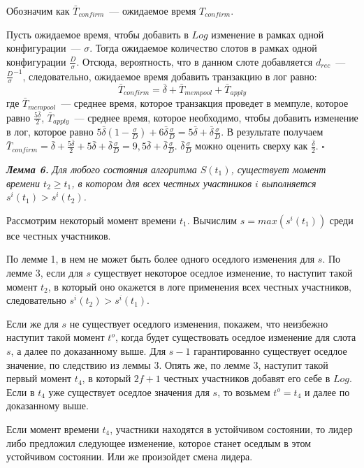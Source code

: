 Обозначим как $\bar{T}_{confirm}$~--- ожидаемое время  $T_{confirm}$.

Пусть ожидаемое время, чтобы добавить в $Log$ изменение в рамках одной конфигурации~--- $\sigma$.
Тогда ожидаемое количество слотов в рамках одной конфигурации $\frac{D}{\sigma}$. Отсюда, вероятность, что в данном слоте добавляется $d_{rec}$~--- $\frac{D}{\sigma}^{-1}$, следовательно, ожидаемое время добавить транзакцию в лог равно: 
$$\bar{T}_{confirm}=\bar{\delta}+\bar{T}_{mempool}+\bar{T}_{apply}$$
где $\bar{T}_{mempool}$~--- среднее время, которое транзакция проведет в мемпуле, которое равно $\frac{5\bar{\delta}}{2}$, $\bar{T}_{apply}$~--- среднее время, которое необходимо, чтобы добавить изменение в лог, которое равно $5\bar{\delta}(1-\frac{\sigma}{D})+6\bar{\delta}\frac{\sigma}{D}=5\bar{\delta}+\bar{\delta}\frac{\sigma}{D}$.
В результате получаем $\bar{T}_{confirm}=\bar{\delta}+\frac{5\bar{\delta}}{2}+5\bar{\delta}+\bar{\delta}\frac{\sigma}{D}=9,5\bar{\delta}+\bar{\delta}\frac{\sigma}{D}$. $\bar{\delta}\frac{\sigma}{D}$ можно оценить сверху как $\frac{\bar{\delta}}{2}$. $\square$
\vspace{10pt}

\textbf{\textit{Лемма 6.}}  \textit{Для любого состояния алгоритма $S(t_1)$, существует момент времени $t_2 \ge t_1$, в котором для всех честных участников $i$ выполняется $s^i(t_1)> s^i(t_2)$.}

Рассмотрим некоторый момент времени $t_1$. Вычислим $s=max(s^i(t_1))$ среди все честных участников. 

По лемме 1, в нем не может быть более одного оседлого изменения для $s$. По лемме 3, если для $s$ существует некоторое оседлое изменение, то наступит такой момент $t_2$, в который оно окажется в логе применения всех честных участников, следовательно $s^i(t_2)> s^i(t_1)$.

Если же для $s$ не существует оседлого изменения, покажем, что неизбежно наступит такой момент $t^o$, когда будет существовать оседлое изменение для слота $s$, а далее по доказанному выше. Для $s-1$ гарантированно существует оседлое значение, по следствию из леммы 3. Опять же, по лемме 3, наступит такой первый момент $t_4$, в который $2f+1$ честных участников добавят его себе в $Log$. Если в $t_4$ уже существует оседлое значения для $s$, то возьмем $t^o=t_4$ и далее по доказанному выше. 

Если момент времени $t_4$, участники находятся в устойчивом состоянии, то лидер либо предложил следующее изменение, которое станет оседлым в этом устойчивом состоянии. Или же произойдет смена лидера.

